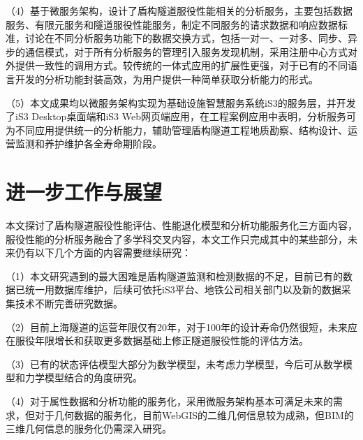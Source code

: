 （4）基于微服务架构，设计了盾构隧道服役性能相关的分析服务，主要包括数据服务、有限元服务和隧道服役性能服务，制定不同服务的请求数据和响应数据标准，讨论在不同分析服务功能下的数据交换方式，包括一对一、一对多、同步、异步的通信模式，对于所有分析服务的管理引入服务发现机制，采用注册中心方式对外提供一致性的调用方式。较传统的一体式应用的扩展性更强，对于已有的不同语言开发的分析功能封装高效，为用户提供一种简单获取分析能力的形式。

（5）本文成果均以微服务架构实现为基础设施智慧服务系统iS3的服务层，并开发了iS3 Desktop桌面端和iS3 Web网页端应用，在工程案例应用中表明，分析服务可为不同应用提供统一的分析能力，辅助管理盾构隧道工程地质勘察、结构设计、运营监测和养护维护各全寿命期阶段。

\section{进一步工作与展望}

本文探讨了盾构隧道服役性能评估、性能退化模型和分析功能服务化三方面内容，服役性能的分析服务融合了多学科交叉内容，本文工作只完成其中的某些部分，未来仍有以下几个方面的内容需要继续研究：

（1）本文研究遇到的最大困难是盾构隧道监测和检测数据的不足，目前已有的数据已统一用数据库维护，后续可依托iS3平台、地铁公司相关部门以及新的数据采集技术不断完善研究数据。

（2）目前上海隧道的运营年限仅有20年，对于100年的设计寿命仍然很短，未来应在服役年限增长和获取更多数据基础上修正隧道服役性能的评估方法。

（3）已有的状态评估模型大部分为数学模型，未考虑力学模型，今后可从数学模型和力学模型结合的角度研究。

（4）对于属性数据和分析功能的服务化，采用微服务架构基本可满足未来的需求，但对于几何数据的服务化，目前WebGIS的二维几何信息较为成熟，但BIM的三维几何信息的服务化仍需深入研究。